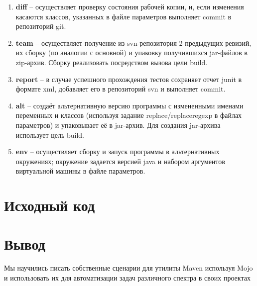 \documentclass[12pt,a4paper]{article}
\begin{document}
\begin{enumerate}
    \item \textbf{diff} -- осуществляет проверку состояния рабочей копии, и, если изменения касаются классов, указанных в файле параметров выполняет commit в репозиторий git.
    \item \textbf{team} -- осуществляет получение из svn-репозитория 2 предыдущих ревизий, их сборку (по аналогии с основной) и упаковку получившихся jar-файлов в zip-архив. Сборку реализовать посредством вызова цели build.
    \item \textbf{report} -- в случае успешного прохождения тестов сохраняет отчет junit в формате xml, добавляет его в репозиторий svn и выполняет commit.
    \item \textbf{alt} -- создаёт альтернативную версию программы с измененными именами переменных и классов (используя задание replace/replaceregexp в файлах параметров) и упаковывает её в jar-архив. Для создания jar-архива использует цель build.
    \item \textbf{env} -- осуществляет сборку и запуск программы в альтернативных окружениях; окружение задается версией java и набором аргументов виртуальной машины в файле параметров.
\end{enumerate}
\section*{Исходный код}

\section*{Вывод}
Мы научились писать собственные сценарии для утилиты Maven используя Mojo и использовать их для автоматизации задач различного спектра в своих проектах
\end{document}
